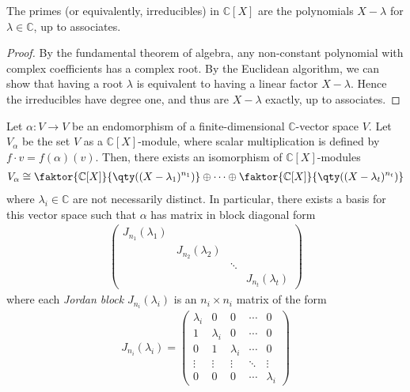 \begin{lemma} \label{lem:16.10}
	The primes (or equivalently, irreducibles) in $\mathbb C[X]$ are the polynomials $X - \lambda$ for $\lambda \in \mathbb C$, up to associates.
\end{lemma}

\begin{proof}
	By the fundamental theorem of algebra, any non-constant polynomial with complex coefficients has a complex root.
	By the Euclidean algorithm, we can show that having a root $\lambda$ is equivalent to having a linear factor $X - \lambda$.
	Hence the irreducibles have degree one, and thus are $X - \lambda$ exactly, up to associates.
\end{proof}

\begin{theorem} \label{thm:jnf}
	Let $\alpha : V \to V$ be an endomorphism of a finite-dimensional $\mathbb C$-vector space $V$.
	Let $V_\alpha$ be the set $V$ as a $\mathbb C[X]$-module, where scalar multiplication is defined by $f\cdot v = f(\alpha)(v)$.
	Then, there exists an isomorphism of $\mathbb C[X]$-modules
	\begin{align*}
		V_\alpha \cong \faktor{\mathbb C[X]}{\qty((X-\lambda_1)^{n_1})} \oplus \dots \oplus \faktor{\mathbb C[X]}{\qty((X-\lambda_t)^{n_t})}
	\end{align*}
	where $\lambda_i \in \mathbb C$ are not necessarily distinct.
	In particular, there exists a basis for this vector space such that $\alpha$ has matrix in block diagonal form
	\begin{align*}
		\begin{pmatrix}
			J_{n_1}(\lambda_1)                                  \\
			 & J_{n_2}(\lambda_2)                               \\
			 &                    & \ddots                      \\
			 &                    &        & J_{n_t}(\lambda_t)
		\end{pmatrix}
	\end{align*}
	where each \textit{Jordan block} $J_{n_i}(\lambda_i)$ is an $n_i \times n_i$ matrix of the form
	\begin{align*}
		J_{n_i}(\lambda_i) = \begin{pmatrix}
			\lambda_i & 0         & 0         & \cdots & 0         \\
			1         & \lambda_i & 0         & \cdots & 0         \\
			0         & 1         & \lambda_i & \cdots & 0         \\
			\vdots    & \vdots    & \vdots    & \ddots & \vdots    \\
			0         & 0         & 0         & \cdots & \lambda_i
		\end{pmatrix}
	\end{align*}
\end{theorem}

